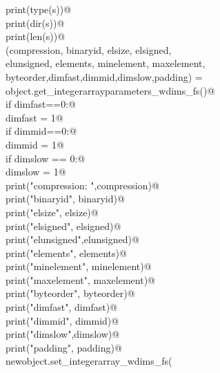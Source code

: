 \documentclass[10pt,a4paper,twoside,notitlepage]{article}
\begin{document}
\begin{flushleft}
\begin{minipage}{\linewidth}
\begin{list}{}{}
\mbox{}\verb@                print(type(s))@\\
\mbox{}\verb@                print(dir(s))@\\
\mbox{}\verb@                print(len(s))@\\
\mbox{}\verb@                (compression, binaryid, elsize, elsigned, \@\\
\mbox{}\verb@                    elunsigned, elements, minelement, maxelement, \@\\
\mbox{}\verb@                    byteorder,dimfast,dimmid,dimslow,padding) = \@\\
\mbox{}\verb@                    object.get_integerarrayparameters_wdims_fs()@\\
\mbox{}\verb@                if dimfast==0:@\\
\mbox{}\verb@                    dimfast = 1@\\
\mbox{}\verb@                if dimmid==0:@\\
\mbox{}\verb@                    dimmid = 1@\\
\mbox{}\verb@                if dimslow == 0:@\\
\mbox{}\verb@                    dimslow = 1@\\
\mbox{}\verb@                print("compression: ",compression)@\\
\mbox{}\verb@                print("binaryid", binaryid)@\\
\mbox{}\verb@                print("elsize", elsize)@\\
\mbox{}\verb@                print("elsigned", elsigned)@\\
\mbox{}\verb@                print("elunsigned",elunsigned)@\\
\mbox{}\verb@                print("elements", elements)@\\
\mbox{}\verb@                print("minelement", minelement)@\\
\mbox{}\verb@                print("maxelement", maxelement)@\\
\mbox{}\verb@                print("byteorder", byteorder)@\\
\mbox{}\verb@                print("dimfast", dimfast)@\\
\mbox{}\verb@                print("dimmid", dimmid)@\\
\mbox{}\verb@                print("dimslow",dimslow)@\\
\mbox{}\verb@                print("padding", padding)@\\
\mbox{}\verb@                newobject.set_integerarray_wdims_fs(\@\\

\end{list}
\end{minipage}
\end{flushleft}
\end{document}
